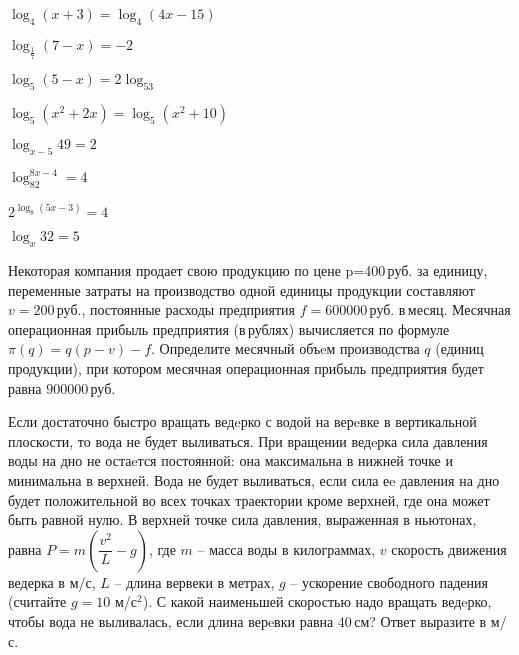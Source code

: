 \begin{class}[number=1]
\begin{listofex}
\begin{enumcols}[itemcolumns=2]
			\item \( \log_4(x+3)=\log_4(4x-15) \)
			\item \( \log_{\frac{1}{7}}(7-x)=-2 \)
			\item \( \log_5(5-x)=2\log_53 \)
			\item \( \log_5(x^2+2x)=\log_5(x^2+10) \)
			\item \( \log_{x-5}49=2 \)
			\item \( \log_82^{8x-4}=4 \)
			\item \( 2^{\log_8(5x-3)}=4 \)
			\item \( \log_x32=5 \)
		\end{enumcols}
		\item Некоторая компания продает свою продукцию по цене p=400 руб. за единицу, переменные затраты на производство одной единицы продукции составляют \( v=200 \) руб., постоянные расходы предприятия \( f= 600000 \) руб. в месяц. Месячная операционная прибыль предприятия (в рублях) вычисляется по формуле \( \pi(q)=q(p-v)-f \). Определите месячный объeм производства \( q \) (единиц продукции), при котором месячная операционная прибыль предприятия будет равна \( 900 000 \) руб.
		\item Если достаточно быстро вращать ведeрко с водой на верeвке в вертикальной плоскости, то вода не будет выливаться. При вращении ведeрка сила давления воды на дно не остаeтся постоянной: она максимальна в нижней точке и минимальна в верхней. Вода не будет выливаться, если сила еe давления на дно будет положительной во всех точках траектории кроме верхней, где она может быть равной нулю. В верхней точке сила давления, выраженная в ньютонах, равна \( P=m \left( \dfrac{v^2}{L}-g \right) \), где \( m \) -- масса воды в килограммах, \( v \) скорость движения ведерка в м/с, \( L \) -- длина вервеки в метрах, \( g \) -- ускорение свободного падения (считайте \( g=10 \) м/с\( ^2 \)). С какой наименьшей скоростью надо вращать ведeрко, чтобы вода не выливалась, если длина верeвки равна \( 40 \) см? Ответ выразите в м/с.
	\end{listofex}
\end{class}
%
%
%
%
